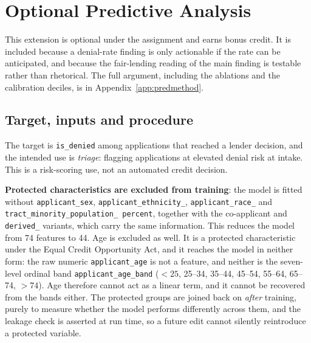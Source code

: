 \documentclass[sigconf,balance=false]{acmart}
\begin{document}
\section{Optional Predictive Analysis}\label{sec:predictive}

This extension is optional under the assignment and earns bonus credit. It is
included because a denial-rate finding is only actionable if the rate can be
anticipated, and because the fair-lending reading of the main finding is
testable rather than rhetorical. The full argument, including the ablations
and the calibration deciles, is in Appendix~\ref{app:predmethod}.

\subsection{Target, inputs and procedure}

The target is \texttt{is\_\allowbreak denied} among applications that reached
a lender decision, and the intended use is \emph{triage}: flagging
applications at elevated denial risk at intake. This is a risk-scoring use,
not an automated credit decision.

\textbf{Protected characteristics are excluded from training}: the model is
fitted without \texttt{applicant\_\allowbreak sex},
\texttt{applicant\_\allowbreak ethnicity\_},
\texttt{applicant\_\allowbreak race\_} and
\texttt{tract\_\allowbreak minority\_\allowbreak population\_\allowbreak
percent}, together with the co-applicant and \texttt{derived\_\allowbreak *}
variants, which carry the same information. This reduces the model from 74
features to 44. Age is excluded as well. It is a protected characteristic
under the Equal Credit Opportunity Act, and it reaches the model in neither
form: the raw numeric \texttt{applicant\_\allowbreak age} is not a
feature, and neither is the seven-level ordinal band
\texttt{applicant\_\allowbreak age\_\allowbreak band} ($<25$, 25--34,
35--44, 45--54, 55--64, 65--74, $>74$). Age therefore cannot act as a
linear term, and it cannot be recovered from the bands either. The
protected groups are joined back on \emph{after} training, purely to
measure whether the model performs differently across them, and the leakage
check is asserted at run time, so a future edit cannot silently reintroduce
a protected variable.
\end{document}
